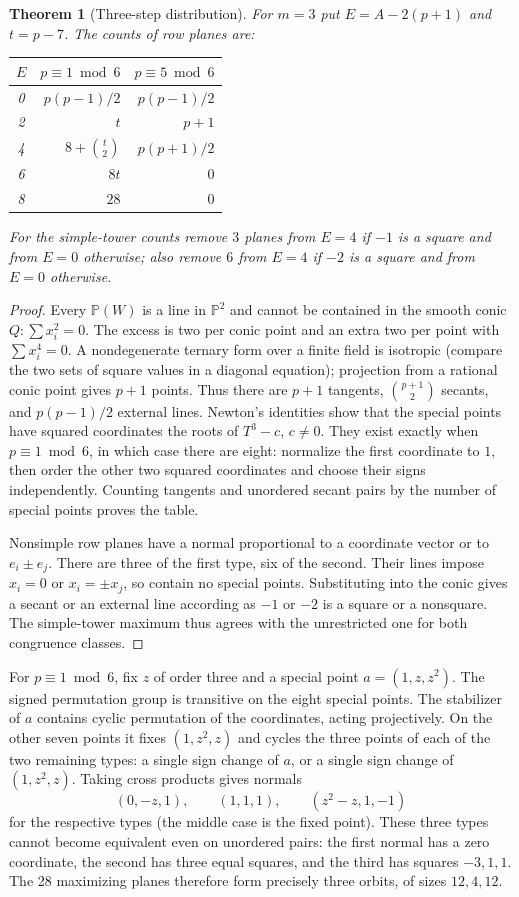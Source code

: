 \documentclass[11pt]{article}
\newtheorem{theorem}{Theorem}
\newcommand{\PP}{\mathbb P}
\begin{document}
\begin{theorem}[Three-step distribution]
For $m=3$ put $E=A-2(p+1)$ and $t=p-7$. The counts of row planes are:
\begin{center}
\begin{tabular}{crr}
\toprule
$E$ & $p\equiv1\bmod6$ & $p\equiv5\bmod6$\\
\midrule
0 & $p(p-1)/2$ & $p(p-1)/2$\\
2 & $t$ & $p+1$\\
4 & $8+\binom t2$ & $p(p+1)/2$\\
6 & $8t$ & $0$\\
8 & $28$ & $0$\\
\bottomrule
\end{tabular}
\end{center}
For the simple-tower counts remove $3$ planes from $E=4$ if
$-1$ is a square and from $E=0$ otherwise; also remove $6$ from
$E=4$ if $-2$ is a square and from $E=0$ otherwise.
\end{theorem}
\begin{proof}
Every $\PP(W)$ is a line in $\PP^2$ and cannot be contained in the
smooth conic $Q:\sum x_i^2=0$. The excess is two per conic point
and an extra two per point with $\sum x_i^4=0$. A nondegenerate
ternary form over a finite field is isotropic (compare the two
sets of square values in a diagonal equation); projection from
a rational conic point gives $p+1$ points. Thus there are
$p+1$ tangents, $\binom{p+1}{2}$ secants, and $p(p-1)/2$ external
lines. Newton's identities show that the special points have
squared coordinates the roots of $T^3-c$, $c\ne0$. They exist
exactly when $p\equiv1\bmod6$, in which case there are eight:
normalize the first coordinate to $1$, then order the other
two squared coordinates and choose their signs independently.
Counting tangents and unordered secant pairs by the number of
special points proves the table.

Nonsimple row planes have a normal proportional to a coordinate
vector or to $e_i\pm e_j$. There are three of the first type,
six of the second. Their lines impose $x_i=0$ or $x_i=\pm x_j$,
so contain no special points. Substituting into the conic gives
a secant or an external line according as $-1$ or $-2$ is a
square or a nonsquare. The simple-tower maximum thus agrees
with the unrestricted one for both congruence classes.
\end{proof}

For $p\equiv1\bmod6$, fix $z$ of order three and a special point
$a=(1,z,z^2)$. The signed permutation group is transitive on the
eight special points. The stabilizer of $a$ contains cyclic
permutation of the coordinates, acting projectively. On the other
seven points it fixes $(1,z^2,z)$ and cycles the three points of
each of the two remaining types: a single sign change of $a$, or a
single sign change of $(1,z^2,z)$. Taking cross products gives normals
\[
 (0,-z,1),\qquad (1,1,1),\qquad (z^2-z,1,-1)
\]
for the respective types (the middle case is the fixed point).
These three types cannot become equivalent even on unordered pairs:
the first normal has a zero coordinate, the second has three equal
squares, and the third has squares $-3,1,1$. The 28 maximizing planes
therefore form precisely three orbits, of sizes $12,4,12$.
\end{document}
